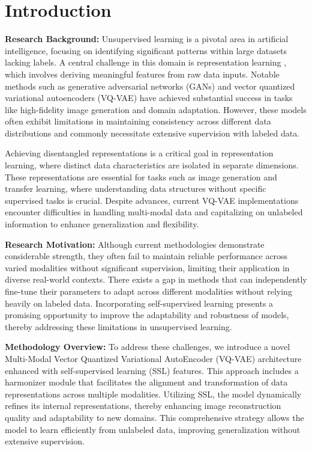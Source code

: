 \section{Introduction}

\textbf{Research Background:} Unsupervised learning is a pivotal area in artificial intelligence, focusing on identifying significant patterns within large datasets lacking labels. A central challenge in this domain is representation learning \cite{bengio2013representation, lecun2015deep}, which involves deriving meaningful features from raw data inputs. Notable methods such as generative adversarial networks (GANs) \cite{goodfellow2014generative} and vector quantized variational autoencoders (VQ-VAE) \cite{van2017neural} have achieved substantial success in tasks like high-fidelity image generation and domain adaptation. However, these models often exhibit limitations in maintaining consistency across different data distributions and commonly necessitate extensive supervision with labeled data.

Achieving disentangled representations is a critical goal in representation learning, where distinct data characteristics are isolated in separate dimensions. These representations are essential for tasks such as image generation and transfer learning, where understanding data structures without specific supervised tasks is crucial. Despite advances, current VQ-VAE implementations encounter difficulties in handling multi-modal data and capitalizing on unlabeled information to enhance generalization and flexibility.

\textbf{Research Motivation:} Although current methodologies demonstrate considerable strength, they often fail to maintain reliable performance across varied modalities without significant supervision, limiting their application in diverse real-world contexts. There exists a gap in methods that can independently fine-tune their parameters to adapt across different modalities without relying heavily on labeled data. Incorporating self-supervised learning presents a promising opportunity to improve the adaptability and robustness of models, thereby addressing these limitations in unsupervised learning.

\textbf{Methodology Overview:} To address these challenges, we introduce a novel Multi-Modal Vector Quantized Variational AutoEncoder (VQ-VAE) architecture enhanced with self-supervised learning (SSL) features. This approach includes a harmonizer module that facilitates the alignment and transformation of data representations across multiple modalities. Utilizing SSL, the model dynamically refines its internal representations, thereby enhancing image reconstruction quality and adaptability to new domains. This comprehensive strategy allows the model to learn efficiently from unlabeled data, improving generalization without extensive supervision.

